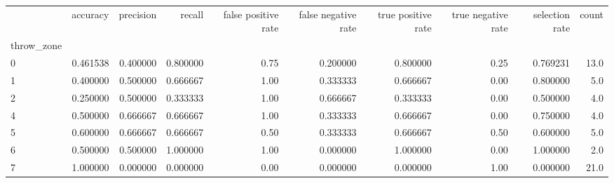 \begin{tabular}{lrrrrrrrrr}
\toprule
{} &  accuracy &  precision &    recall &  false positive rate &  false negative rate &  true positive rate &  true negative rate &  selection rate &  count \\
throw\_zone &           &            &           &                      &                      &                     &                     &                 &        \\
\midrule
0          &  0.461538 &   0.400000 &  0.800000 &                 0.75 &             0.200000 &            0.800000 &                0.25 &        0.769231 &   13.0 \\
1          &  0.400000 &   0.500000 &  0.666667 &                 1.00 &             0.333333 &            0.666667 &                0.00 &        0.800000 &    5.0 \\
2          &  0.250000 &   0.500000 &  0.333333 &                 1.00 &             0.666667 &            0.333333 &                0.00 &        0.500000 &    4.0 \\
4          &  0.500000 &   0.666667 &  0.666667 &                 1.00 &             0.333333 &            0.666667 &                0.00 &        0.750000 &    4.0 \\
5          &  0.600000 &   0.666667 &  0.666667 &                 0.50 &             0.333333 &            0.666667 &                0.50 &        0.600000 &    5.0 \\
6          &  0.500000 &   0.500000 &  1.000000 &                 1.00 &             0.000000 &            1.000000 &                0.00 &        1.000000 &    2.0 \\
7          &  1.000000 &   0.000000 &  0.000000 &                 0.00 &             0.000000 &            0.000000 &                1.00 &        0.000000 &   21.0 \\
\bottomrule
\end{tabular}

